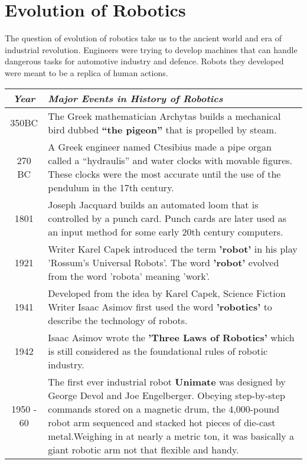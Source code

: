 \section{Evolution of Robotics}
\par The question of evolution of robotics take us to the ancient world and era of industrial revolution. Engineers were trying to develop machines that can handle dangerous tasks for automotive industry and defence. Robots they developed were meant to be a replica of human actions. 
\begin{table}
    \centering
    \begin{tabular}{|c|p{14cm}|}
    \hline
        \textbf{\textit{Year}} & \hspace{30mm}\textbf{\textit{Major Events in History of Robotics}} \\ \hline
        \rowcolor[gray]{0.95} 350BC & The Greek mathematician Archytas builds a mechanical bird dubbed \textbf{“the pigeon”} that is propelled by steam. \\ \hline
        270 BC & A Greek engineer named Ctesibius made a pipe organ called a “hydraulis” and water clocks with movable figures. These clocks were the most accurate until the use of the pendulum in the 17th century. \\ \hline
        \rowcolor[gray]{0.95} 1801 & Joseph Jacquard builds an automated loom that is controlled by a punch card. Punch cards are later used as an input method for some early 20th century computers. \\ \hline
        1921 & Writer Karel Capek introduced the term \textbf{'robot'} in his play 'Rossum's Universal Robots'. The word \textbf{'robot'} evolved from the word 'robota' meaning 'work'. \\ \hline
        \rowcolor[gray]{0.95} 1941 & Developed from the idea by Karel Capek, Science Fiction Writer Isaac Asimov first used the word \textbf{'robotics'} to describe the technology of robots. \\ \hline
        1942 & Isaac Asimov wrote the \textbf{'Three Laws of Robotics'} which is still considered as the foundational rules of robotic industry. \\ \hline
        \rowcolor[gray]{0.95} 1950 - 60 & The first ever industrial robot \textbf{Unimate} was designed by George Devol and Joe Engelberger. Obeying step-by-step commands stored on a magnetic drum, the 4,000-pound robot arm sequenced and stacked hot pieces of die-cast metal.Weighing in at nearly a metric ton, it was basically a giant robotic arm not that flexible and handy. \\ \hline

\end{tabular}
\end{table}
